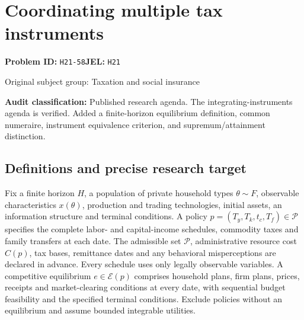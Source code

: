 \documentclass[11pt,a4paper]{article}
\begin{document}
\section*{Coordinating multiple tax instruments}
\textbf{Problem ID:} \texttt{H21-58}\quad \textbf{JEL:} \texttt{H21}\par
\label{problem:OP-0471}
{\sffamily\small\color{muted}Original subject group: Taxation and social insurance\par}
\label{definitions:problem:30007753}
\textbf{Audit classification:} Published research agenda. The integrating-instruments agenda is verified. Added a finite-horizon equilibrium definition, common numeraire, instrument equivalence criterion, and supremum/attainment distinction.
\subsection*{Definitions and precise research target}
Fix a finite horizon \(H\), a population of private household types \(\theta\sim F\), observable characteristics \(x(\theta)\), production and trading technologies, initial assets, an information structure and terminal conditions. A policy \(p=(T_y,T_k,t_c,T_f)\in\mathcal P\) specifies the complete labor- and capital-income schedules, commodity taxes and family transfers at each date. The admissible set \(\mathcal P\), administrative resource cost \(C(p)\), tax bases, remittance dates and any behavioral misperceptions are declared in advance. Every schedule uses only legally observable variables. A competitive equilibrium \(e\in\mathcal E(p)\) comprises household plans, firm plans, prices, receipts and market-clearing conditions at every date, with sequential budget feasibility and the specified terminal conditions. Exclude policies without an equilibrium and assume bounded integrable utilities.
\end{document}
